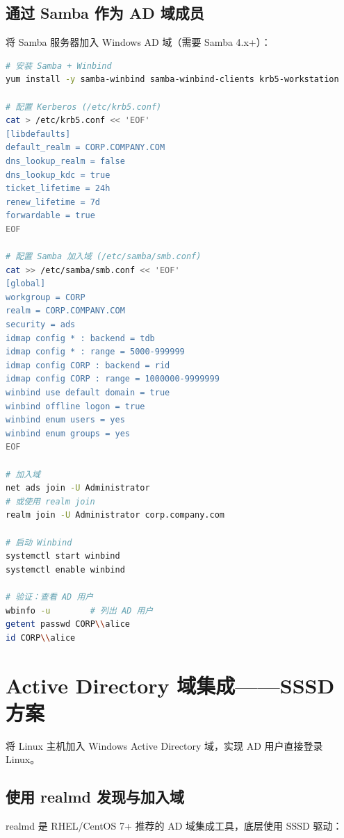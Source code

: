 \documentclass[12pt,UTF8]{ctexbook}
\begin{document}
\subsection{通过 Samba 作为 AD 域成员}

将 Samba 服务器加入 Windows AD 域（需要 Samba 4.x+）：

\begin{lstlisting}[language=bash]
# 安装 Samba + Winbind
yum install -y samba-winbind samba-winbind-clients krb5-workstation

# 配置 Kerberos (/etc/krb5.conf)
cat > /etc/krb5.conf << 'EOF'
[libdefaults]
default_realm = CORP.COMPANY.COM
dns_lookup_realm = false
dns_lookup_kdc = true
ticket_lifetime = 24h
renew_lifetime = 7d
forwardable = true
EOF

# 配置 Samba 加入域 (/etc/samba/smb.conf)
cat >> /etc/samba/smb.conf << 'EOF'
[global]
workgroup = CORP
realm = CORP.COMPANY.COM
security = ads
idmap config * : backend = tdb
idmap config * : range = 5000-999999
idmap config CORP : backend = rid
idmap config CORP : range = 1000000-9999999
winbind use default domain = true
winbind offline logon = true
winbind enum users = yes
winbind enum groups = yes
EOF

# 加入域
net ads join -U Administrator
# 或使用 realm join
realm join -U Administrator corp.company.com

# 启动 Winbind
systemctl start winbind
systemctl enable winbind

# 验证：查看 AD 用户
wbinfo -u        # 列出 AD 用户
getent passwd CORP\\alice
id CORP\\alice
\end{lstlisting}

\section{Active Directory 域集成——SSSD 方案}
\label{sec:ad-integration}

将 Linux 主机加入 Windows Active Directory 域，实现 AD 用户直接登录 Linux。

\subsection{使用 realmd 发现与加入域}

realmd 是 RHEL/CentOS 7+ 推荐的 AD 域集成工具，底层使用 SSSD 驱动：
\end{document}
